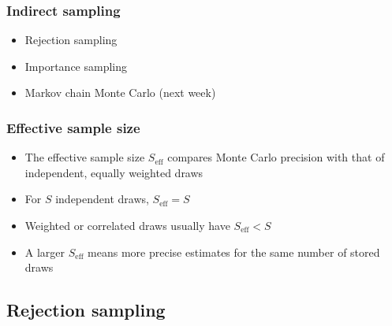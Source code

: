 \documentclass[10pt]{beamer}
\begin{document}
\begin{frame}

\frametitle{Indirect sampling}

  \begin{itemize}
  \item Rejection sampling
  \pause
  \item Importance sampling
  \pause
  \item Markov chain Monte Carlo (next week)
  \end{itemize}

\end{frame}

\begin{frame}

\frametitle{Effective sample size}

  \begin{itemize}
    \item The effective sample size $S_\text{eff}$ compares Monte Carlo
      precision with that of independent, equally weighted draws
    \item For $S$ independent draws, $S_\text{eff}=S$
    \pause
    \item Weighted or correlated draws usually have $S_\text{eff}<S$
    \item A larger $S_\text{eff}$ means more precise estimates for the
      same number of stored draws
  \end{itemize}

\end{frame}

\subsection{Rejection sampling}
\end{document}
